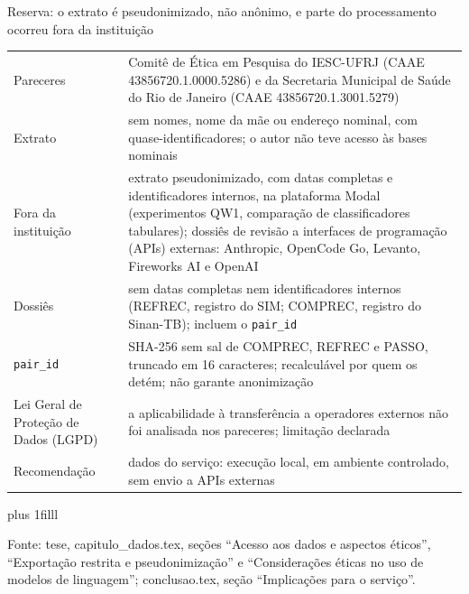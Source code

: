 \documentclass[aspectratio=169,11pt]{beamer}
\let\ressalvatexto\relax
\newcommand{\fontealign}{\raggedright}
\newcommand{\fonte}[2][tese, ]{\par\vskip 0pt plus 1filll
  \ifx\ressalvatexto\relax\else{\raggedright\footnotesize\color{black!70}\textit{Ressalva:} \ressalvatexto\par}\vskip 3pt\fi
  {\fontealign\tiny\color{black!65}Fonte: #1#2.\par}\vskip 3pt\global\let\ressalvatexto\relax}
\begin{document}
\begin{frame}[label=R02]{Reserva: o extrato é pseudonimizado, não anônimo, e parte do processamento ocorreu fora da instituição}
\scriptsize
\renewcommand{\arraystretch}{0.9}
\begin{tabular}{L{.17\textwidth}L{.77\textwidth}}
\toprule
Pareceres & Comitê de Ética em Pesquisa do IESC-UFRJ (CAAE 43856720.1.0000.5286) e da Secretaria Municipal de Saúde do Rio de Janeiro (CAAE 43856720.1.3001.5279) \\
\addlinespace[3pt]
Extrato & sem nomes, nome da mãe ou endereço nominal, com quase-identificadores; o autor não teve acesso às bases nominais \\
\addlinespace[3pt]
Fora da instituição & extrato pseudonimizado, com datas completas e identificadores internos, na plataforma Modal (experimentos QW1, comparação de classificadores tabulares); dossiês de revisão a interfaces de programação (APIs) externas: Anthropic, OpenCode Go, Levanto, Fireworks AI e OpenAI \\
\addlinespace[3pt]
Dossiês & sem datas completas nem identificadores internos (REFREC, registro do SIM; COMPREC, registro do Sinan-TB); incluem o \texttt{pair\_id} \\
\addlinespace[3pt]
\texttt{pair\_id} & SHA-256 sem sal de COMPREC, REFREC e PASSO, truncado em 16 caracteres; recalculável por quem os detém; não garante anonimização \\
\addlinespace[3pt]
Lei Geral de Proteção de Dados (LGPD) & a aplicabilidade à transferência a operadores externos não foi analisada nos pareceres; limitação declarada \\
\addlinespace[3pt]
Recomendação & dados do serviço: execução local, em ambiente controlado, sem envio a APIs externas \\
\bottomrule
\end{tabular}
\fonte{capitulo\_dados.tex, seções ``Acesso aos dados e aspectos éticos'', ``Exportação restrita e pseudonimização'' e ``Considerações éticas no uso de modelos de linguagem''; conclusao.tex, seção ``Implicações para o serviço''}
\end{frame}
\end{document}
